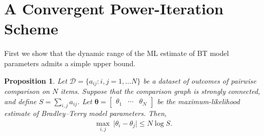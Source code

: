 \documentclass[12pt,a4paper,oneside]{article}
\theoremstyle{plain}
\newtheorem{proposition}{Proposition}
\begin{document}
\section{A Convergent Power-Iteration Scheme}

First we show that the dynamic range of the ML estimate of BT model parameters admits a simple upper bound.

\begin{proposition}
Let $\mathcal{D} = \{ a_{ij} : i, j = 1, \ldots N \}$ be a dataset of outcomes of pairwise comparison on $N$ items.
Suppose that the comparison graph is strongly connected, and define $S = \sum_{i, j} a_{ij}$.
Let $\bm{\theta} = \begin{bmatrix}\theta_1 & \cdots & \theta_N \end{bmatrix}$ be the maximum-likelihood estimate of Bradley--Terry model parameters.
Then,
\begin{align*}
\max_{i, j} \ \lvert \theta_i - \theta_j \rvert \le N \log S.
\end{align*}
\end{proposition}
\end{document}
